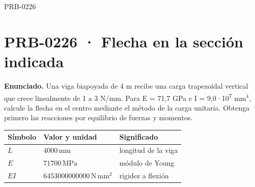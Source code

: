 \begin{studiumworked}{PRB-0226}

\section{PRB-0226 · Flecha en la sección indicada}

\textbf{Enunciado.} Una viga biapoyada de 4 m recibe una carga trapezoidal vertical que crece linealmente de 1 a 3 N/mm. Para E = 71,7 GPa e I = 9,0·10\textsuperscript{7} mm$^4$, calcule la flecha en el centro mediante el método de la carga unitaria. Obtenga primero las reacciones por equilibrio de fuerzas y momentos.

\par\medskip\noindent\begin{tabular}{@{}p{.18\linewidth}p{.26\linewidth}p{.48\linewidth}@{}}
\toprule Símbolo & Valor y unidad & Significado\\\midrule
$L$ & $4000\,\mathrm{mm}$ & longitud de la viga\\
$E$ & $71700\,\mathrm{MPa}$ & módulo de Young\\
$EI$ & $6453000000000\,\mathrm{N\,mm^2}$ & rigidez a flexión\\
\bottomrule\end{tabular}\par\medskip


\end{studiumworked}
